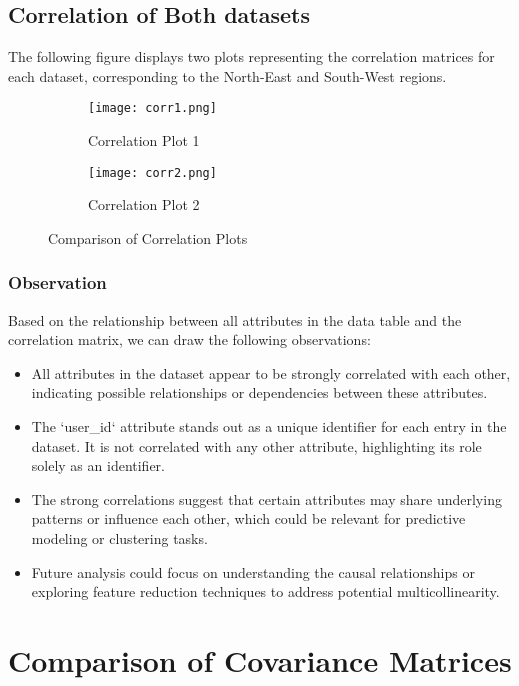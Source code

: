 \documentclass[11pt]{article}
\begin{document}
\subsection{Correlation of Both datasets}
The following figure displays two plots representing the correlation matrices for each dataset, corresponding to the North-East and South-West regions.
\begin{figure}[H]
    \centering
    \begin{subfigure}{0.45\textwidth}
        \centering
        \texttt{[image: corr1.png]}
        \caption{Correlation Plot 1}
        \label{fig:corr1}
    \end{subfigure}\hfill
    \begin{subfigure}{0.45\textwidth}
        \centering
        \texttt{[image: corr2.png]}
        \caption{Correlation Plot 2}
        \label{fig:corr2}
    \end{subfigure}
    \caption{Comparison of Correlation Plots}
    \label{fig:correlation_plots}
\end{figure}
\subsubsection{Observation}
Based on the relationship between all attributes in the data table and the correlation matrix, we can draw the following observations:

\begin{itemize}
    \item All attributes in the dataset appear to be strongly correlated with each other, indicating possible relationships or dependencies between these attributes.
    \item The `user\_id` attribute stands out as a unique identifier for each entry in the dataset. It is not correlated with any other attribute, highlighting its role solely as an identifier.
    \item The strong correlations suggest that certain attributes may share underlying patterns or influence each other, which could be relevant for predictive modeling or clustering tasks.
    \item Future analysis could focus on understanding the causal relationships or exploring feature reduction techniques to address potential multicollinearity.
\end{itemize}
\section{Comparison of Covariance Matrices}
\end{document}
